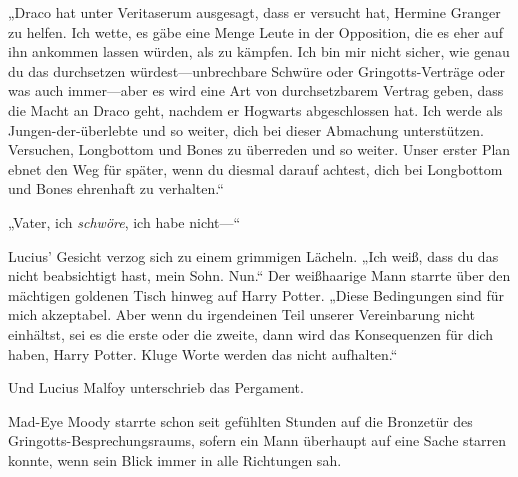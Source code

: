 „Draco hat unter Veritaserum ausgesagt, dass er versucht hat, Hermine Granger zu helfen. Ich wette, es gäbe eine Menge Leute in der Opposition, die es eher auf ihn ankommen lassen würden, als zu kämpfen. Ich bin mir nicht sicher, wie genau du das durchsetzen würdest—unbrechbare Schwüre oder Gringotts-Verträge oder was auch immer—aber es wird eine Art von durchsetzbarem Vertrag geben, dass die Macht an Draco geht, nachdem er Hogwarts abgeschlossen hat. Ich werde als Jungen-der-überlebte und so weiter, dich bei dieser Abmachung unterstützen. Versuchen, Longbottom und Bones zu überreden und so weiter. Unser erster Plan ebnet den Weg für später, wenn du diesmal darauf achtest, dich bei Longbottom und Bones ehrenhaft zu verhalten.“

„Vater, ich \emph{schwöre}, ich habe nicht—“

Lucius' Gesicht verzog sich zu einem grimmigen Lächeln.
„Ich weiß, dass du das nicht beabsichtigt hast, mein Sohn. Nun.“
Der weißhaarige Mann starrte über den mächtigen goldenen Tisch hinweg auf Harry Potter. „Diese Bedingungen sind für mich akzeptabel. Aber wenn du irgendeinen Teil unserer Vereinbarung nicht einhältst, sei es die erste oder die zweite, dann wird das Konsequenzen für dich haben, Harry Potter. Kluge Worte werden das nicht aufhalten.“

Und Lucius Malfoy unterschrieb das Pergament.

\later

Mad-Eye Moody starrte schon seit gefühlten Stunden auf die Bronzetür des Gringotts-Besprechungsraums, sofern ein Mann überhaupt auf eine Sache starren konnte, wenn sein Blick immer in alle Richtungen sah.

